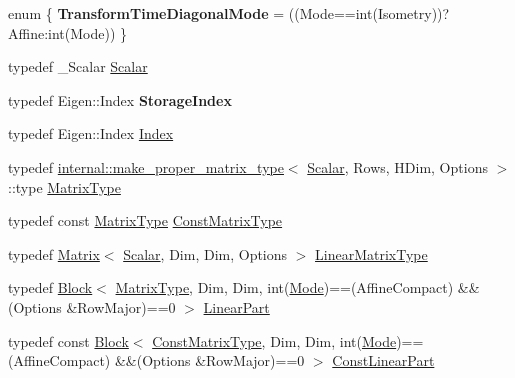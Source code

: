 \begin{DoxyCompactItemize}
\item 
\mbox{\label{class_eigen_1_1_transform_a3e15b6f36b8c2341e84baa611180f9bb}} 
enum \{ {\bfseries Transform\+Time\+Diagonal\+Mode} = ((Mode==int(Isometry))?Affine\+:int(Mode))
 \}
\item 
typedef \+\_\+\+Scalar \mbox{\hyperlink{class_eigen_1_1_transform_a4e69ced9d651745b8ed4eda46f41795d}{Scalar}}
\item 
\mbox{\label{class_eigen_1_1_transform_ae76d83062ee15f941c3b78b2bc31eec4}} 
typedef Eigen\+::\+Index {\bfseries Storage\+Index}
\item 
typedef Eigen\+::\+Index \mbox{\hyperlink{class_eigen_1_1_transform_a49df3689ac2b736bcb564dec47d6486c}{Index}}
\item 
typedef \mbox{\hyperlink{class_eigen_1_1internal_1_1make__proper__matrix__type}{internal\+::make\+\_\+proper\+\_\+matrix\+\_\+type}}$<$ \mbox{\hyperlink{class_eigen_1_1_transform_a4e69ced9d651745b8ed4eda46f41795d}{Scalar}}, Rows, H\+Dim, Options $>$\+::type \mbox{\hyperlink{class_eigen_1_1_transform_a30f72ba46abc2bb3c7fa919c1078fc9c}{Matrix\+Type}}
\item 
typedef const \mbox{\hyperlink{class_eigen_1_1_transform_a30f72ba46abc2bb3c7fa919c1078fc9c}{Matrix\+Type}} \mbox{\hyperlink{class_eigen_1_1_transform_aed436d14b16bd862bac5367990085795}{Const\+Matrix\+Type}}
\item 
typedef \mbox{\hyperlink{class_eigen_1_1_matrix}{Matrix}}$<$ \mbox{\hyperlink{class_eigen_1_1_transform_a4e69ced9d651745b8ed4eda46f41795d}{Scalar}}, Dim, Dim, Options $>$ \mbox{\hyperlink{class_eigen_1_1_transform_a48138c0370e55371b95946c90d69e25c}{Linear\+Matrix\+Type}}
\item 
typedef \mbox{\hyperlink{class_eigen_1_1_block}{Block}}$<$ \mbox{\hyperlink{class_eigen_1_1_transform_a30f72ba46abc2bb3c7fa919c1078fc9c}{Matrix\+Type}}, Dim, Dim, int(\mbox{\hyperlink{struct_mode}{Mode}})==(Affine\+Compact) \&\&(Options \&Row\+Major)==0 $>$ \mbox{\hyperlink{class_eigen_1_1_transform_a1441ef7d89d1f4cebd061db33b993cf2}{Linear\+Part}}
\item 
typedef const \mbox{\hyperlink{class_eigen_1_1_block}{Block}}$<$ \mbox{\hyperlink{class_eigen_1_1_transform_aed436d14b16bd862bac5367990085795}{Const\+Matrix\+Type}}, Dim, Dim, int(\mbox{\hyperlink{struct_mode}{Mode}})==(Affine\+Compact) \&\&(Options \&Row\+Major)==0 $>$ \mbox{\hyperlink{class_eigen_1_1_transform_ac3327ee95457c915e422ff85002e02aa}{Const\+Linear\+Part}}

\end{DoxyCompactItemize}
